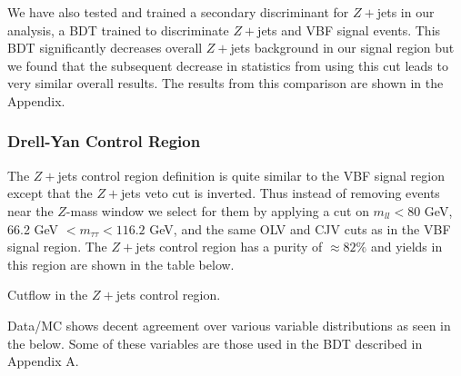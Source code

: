We have also tested and trained a secondary discriminant for $Z+$jets in our analysis, a BDT trained to discriminate $Z+$jets and VBF signal events. This BDT significantly decreases overall $Z+$jets background in our signal region but we found that the subsequent decrease in statistics from using this cut leads to very similar overall results. The results from this comparison are shown in the Appendix. 

\subsubsection{Drell-Yan Control Region}

The $Z+$jets control region definition is quite similar to the VBF signal region except that the $Z+$jets veto cut is inverted. Thus instead of removing events near the $Z$-mass window we select for them by applying a cut on $m_{ll}<80$ GeV,  66.2 GeV $< m_{\tau\tau}< 116.2$ GeV, and the same OLV and CJV cuts as in the VBF signal region. The $Z+$jets control region has a purity of $\approx 82\%$ and yields in this region are shown in the table below.

\begin{table}[h!]
\scalebox{0.4}{

}
\caption{Cutflow in the $Z+$jets control region.}
\label{tab:zttcr}
\end{table}

Data/MC shows decent agreement over various variable distributions as seen in the  below. Some of these variables are those used in the BDT described in Appendix A. 

